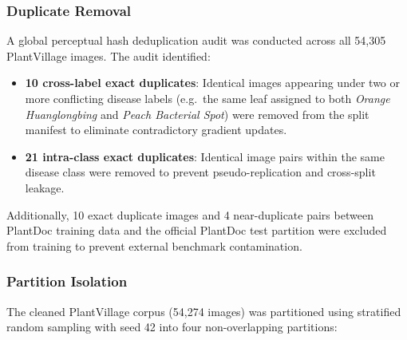 \documentclass[pdflatex,sn-mathphys-num]{sn-jnl}
\theoremstyle{thmstyleone}%
\theoremstyle{thmstyletwo}%
\theoremstyle{thmstylethree}%
\begin{document}
\subsubsection{Duplicate Removal}

A global perceptual hash deduplication audit was conducted across all 54{,}305
PlantVillage images. The audit identified:
\begin{itemize}
  \item \textbf{10 cross-label exact duplicates}: Identical images appearing under two
        or more conflicting disease labels (e.g.\ the same leaf assigned to both
        \textit{Orange Huanglongbing} and \textit{Peach Bacterial Spot}) were removed
        from the split manifest to eliminate contradictory gradient updates.
  \item \textbf{21 intra-class exact duplicates}: Identical image pairs within the same
        disease class were removed to prevent pseudo-replication and cross-split leakage.
\end{itemize}

Additionally, 10 exact duplicate images and 4 near-duplicate pairs between PlantDoc
training data and the official PlantDoc test partition were excluded from training to
prevent external benchmark contamination.

\subsubsection{Partition Isolation}

The cleaned PlantVillage corpus (54{,}274 images) was partitioned using stratified
random sampling with seed 42 into four non-overlapping partitions:
\end{document}
